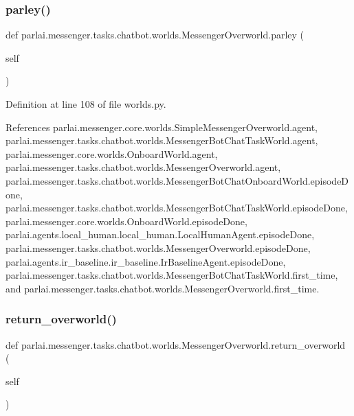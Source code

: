 \subsubsection{\texorpdfstring{parley()}{parley()}}
{\footnotesize\ttfamily def parlai.\+messenger.\+tasks.\+chatbot.\+worlds.\+Messenger\+Overworld.\+parley (\begin{DoxyParamCaption}\item[{}]{self }\end{DoxyParamCaption})}



Definition at line 108 of file worlds.\+py.



References parlai.\+messenger.\+core.\+worlds.\+Simple\+Messenger\+Overworld.\+agent, parlai.\+messenger.\+tasks.\+chatbot.\+worlds.\+Messenger\+Bot\+Chat\+Task\+World.\+agent, parlai.\+messenger.\+core.\+worlds.\+Onboard\+World.\+agent, parlai.\+messenger.\+tasks.\+chatbot.\+worlds.\+Messenger\+Overworld.\+agent, parlai.\+messenger.\+tasks.\+chatbot.\+worlds.\+Messenger\+Bot\+Chat\+Onboard\+World.\+episode\+Done, parlai.\+messenger.\+tasks.\+chatbot.\+worlds.\+Messenger\+Bot\+Chat\+Task\+World.\+episode\+Done, parlai.\+messenger.\+core.\+worlds.\+Onboard\+World.\+episode\+Done, parlai.\+agents.\+local\+\_\+human.\+local\+\_\+human.\+Local\+Human\+Agent.\+episode\+Done, parlai.\+messenger.\+tasks.\+chatbot.\+worlds.\+Messenger\+Overworld.\+episode\+Done, parlai.\+agents.\+ir\+\_\+baseline.\+ir\+\_\+baseline.\+Ir\+Baseline\+Agent.\+episode\+Done, parlai.\+messenger.\+tasks.\+chatbot.\+worlds.\+Messenger\+Bot\+Chat\+Task\+World.\+first\+\_\+time, and parlai.\+messenger.\+tasks.\+chatbot.\+worlds.\+Messenger\+Overworld.\+first\+\_\+time.

\mbox{\label{classparlai_1_1messenger_1_1tasks_1_1chatbot_1_1worlds_1_1MessengerOverworld_a312a3ba00d76a91798589e7308f81bea}} 
\subsubsection{\texorpdfstring{return\+\_\+overworld()}{return\_overworld()}}
{\footnotesize\ttfamily def parlai.\+messenger.\+tasks.\+chatbot.\+worlds.\+Messenger\+Overworld.\+return\+\_\+overworld (\begin{DoxyParamCaption}\item[{}]{self }\end{DoxyParamCaption})}



